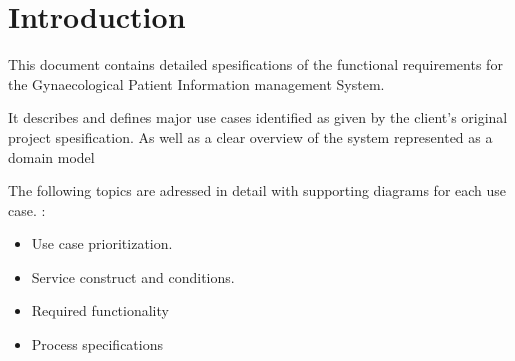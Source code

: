 \section{Introduction}

This document contains detailed spesifications of the functional requirements for the Gynaecological Patient Information
management System. \bigskip

It describes and defines major use cases identified as given by the client's original project spesification. As well as a clear overview of the system represented as a domain model \bigskip

The following topics are adressed in detail with supporting diagrams for each use case. :

\begin{itemize}
	\item Use case prioritization.
	\item Service construct and conditions.
	\item Required functionality
	\item Process specifications
\end{itemize}